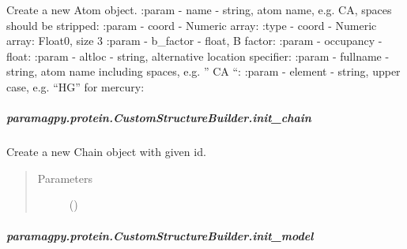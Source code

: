 \documentclass[a4paper,10pt,english]{sphinxmanual}
\begin{document}
\begin{fulllineitems}
\begin{fulllineitems}
\begin{fulllineitems}
\label{\detokenize{reference/generated/paramagpy.protein.CustomStructureBuilder.init_atom:paramagpy.protein.CustomStructureBuilder.init_atom}}
Create a new Atom object.
:param - name - string, atom name, e.g. CA, spaces should be stripped:
:param - coord - Numeric array:
:type - coord - Numeric array: Float0, size 3
:param - b\_factor - float, B factor:
:param - occupancy - float:
:param - altloc - string, alternative location specifier:
:param - fullname - string, atom name including spaces, e.g. ” CA “:
:param - element - string, upper case, e.g. “HG” for mercury:

\end{fulllineitems}



\subparagraph{paramagpy.protein.CustomStructureBuilder.init\_chain}
\label{\detokenize{reference/generated/paramagpy.protein.CustomStructureBuilder.init_chain:paramagpy-protein-customstructurebuilder-init-chain}}\label{\detokenize{reference/generated/paramagpy.protein.CustomStructureBuilder.init_chain::doc}}

\begin{fulllineitems}
\label{\detokenize{reference/generated/paramagpy.protein.CustomStructureBuilder.init_chain:paramagpy.protein.CustomStructureBuilder.init_chain}}
Create a new Chain object with given id.
\begin{quote}\begin{description}
\item[{Parameters}] \leavevmode
{} (\sphinxstyleliteralemphasis{\sphinxupquote{-}}) \textendash{} 

\end{description}\end{quote}

\end{fulllineitems}



\subparagraph{paramagpy.protein.CustomStructureBuilder.init\_model}
\label{\detokenize{reference/generated/paramagpy.protein.CustomStructureBuilder.init_model:paramagpy-protein-customstructurebuilder-init-model}}\label{\detokenize{reference/generated/paramagpy.protein.CustomStructureBuilder.init_model::doc}}


\end{fulllineitems}
\end{fulllineitems}
\end{document}
